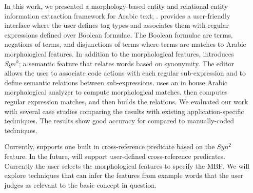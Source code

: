 In this work, we presented a morphology-based entity and relational entity information extraction framework for Arabic text; \framework . 
\framework provides a user-friendly interface where the user defines tag types 
and associates them with regular expressions defined over Boolean formulae. 
The Boolean formulae are terms, negations of terms, and disjunctions of terms where terms are matches to Arabic morphological features. 
In addition to the morphological features, \framework introduces $Syn^k$; a semantic feature that relates words based on synonymity. 
The editor allows the user to associate code actions with each regular sub-expression and to define semantic relations between sub-expressions. 
\framework uses an in house Arabic morphological analyzer to compute morphological matches. \framework then computes regular expression matches, 
and then builds the relations. 
We evaluated our work with several case studies comparing the results with existing application-specific techniques. 
The results show good accuracy for \framework compared to manually-coded techniques.

Currently, \framework supports one built in cross-reference predicate 
based on the $Syn^2$ feature. 
In the future, \framework will support user-defined cross-reference predicates. 
Currently the user selects the morphological features to specify the MBF. 
We will explore techniques that can infer the features from example words 
that the user judges as relevant to the basic concept in question.
